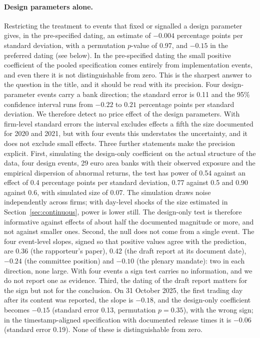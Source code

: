 \documentclass[11pt]{article}
\theoremstyle{plain}\newtheorem{proposition}{Proposition}
\begin{document}
\paragraph{Design parameters alone.} Restricting the treatment to events that fixed or signalled a design parameter gives, in the pre-specified dating, an estimate of $-0.004$ percentage points per standard deviation, with a permutation $p$-value of 0.97, and $-0.15$ in the preferred dating (see below). In the pre-specified dating the small positive coefficient of the pooled specification comes entirely from implementation events, and even there it is not distinguishable from zero. This is the sharpest answer to the question in the title, and it should be read with its precision. Four design-parameter events carry a bank direction; the standard error is 0.11 and the 95\% confidence interval runs from $-0.22$ to $0.21$ percentage points per standard deviation. We therefore detect no price effect of the design parameters. With firm-level standard errors the interval excludes effects a fifth the size documented for 2020 and 2021, but with four events this understates the uncertainty, and it does not exclude small effects. Three further statements make the precision explicit. First, simulating the design-only coefficient on the actual structure of the data, four design events, 29 euro area banks with their observed exposure and the empirical dispersion of abnormal returns, the test has power of 0.54 against an effect of 0.4 percentage points per standard deviation, 0.77 against 0.5 and 0.90 against 0.6, with simulated size of 0.07. The simulation draws noise independently across firms; with day-level shocks of the size estimated in Section~\ref{sec:continuous}, power is lower still. The design-only test is therefore informative against effects of about half the documented magnitude or more, and not against smaller ones. Second, the null does not come from a single event. The four event-level slopes, signed so that positive values agree with the prediction, are 0.36 (the rapporteur's paper), 0.42 (the draft report at its document date), $-0.24$ (the committee position) and $-0.10$ (the plenary mandate): two in each direction, none large. With four events a sign test carries no information, and we do not report one as evidence. Third, the dating of the draft report matters for the sign but not for the conclusion. On 31 October 2025, the first trading day after its content was reported, the slope is $-0.18$, and the design-only coefficient becomes $-0.15$ (standard error 0.13, permutation $p = 0.35$), with the wrong sign; in the timestamp-aligned specification with documented release times it is $-0.06$ (standard error 0.19). None of these is distinguishable from zero.
\end{document}
